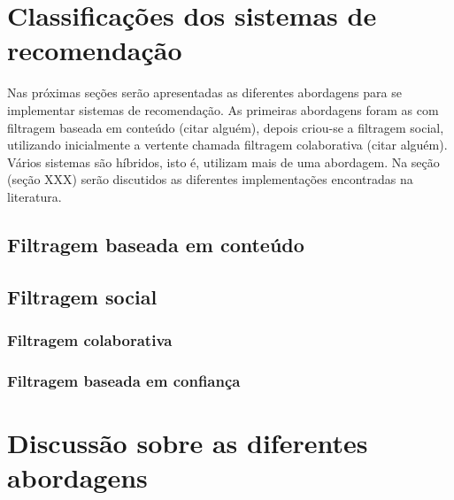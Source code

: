 \section{Classificações dos sistemas de recomendação}

Nas próximas seções serão apresentadas as diferentes abordagens para se implementar sistemas de recomendação. As primeiras abordagens foram as com filtragem baseada em conteúdo (citar alguém), depois criou-se a filtragem social, utilizando inicialmente a vertente chamada filtragem colaborativa (citar alguém). Vários sistemas são híbridos, isto é, utilizam mais de uma abordagem. Na seção (seção XXX) serão discutidos as diferentes implementações encontradas na literatura.

\subsection{Filtragem baseada em conteúdo} %
\cite{Balabanovi97}

\subsection{Filtragem social} %

\subsubsection{Filtragem colaborativa}

\subsubsection{Filtragem baseada em confiança} %

\section{Discussão sobre as diferentes abordagens}

